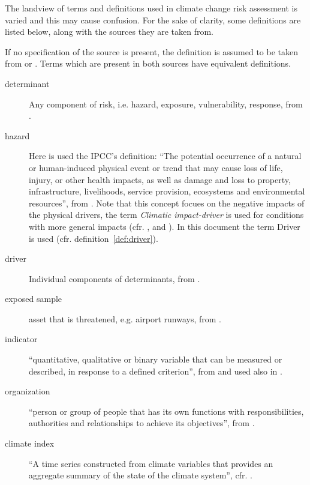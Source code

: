 The landview of terms and definitions used in climate change risk assessment is varied and this may cause confusion. For the sake of clarity, some definitions are listed below, along with the sources they are taken from.

If no specification of the source is present, the definition is assumed to be taken from \cite{2021ISO14091} or \cite{2021MatthewsAnnexVII}. Terms which are present in both sources have equivalent definitions.

\begin{description}
  \item[determinant] Any component of risk, i.e. hazard, exposure, vulnerability, response, from \cite[493]{2023SimpsonAdaptationTo}.
  \item[hazard] Here is used the IPCC's definition: ``The potential occurrence of a natural or human-induced
  physical event or trend that may cause loss of life, injury, or other
  health impacts, as well as damage and loss to property, infrastructure,
  livelihoods, service provision, ecosystems and environmental
  resources'', from \cite[2233]{2021MatthewsAnnexVII}. Note that this concept focues on the negative impacts of the physical drivers, the term \emph{Climatic impact-driver} is used for conditions with more general impacts (cfr. \cite[2224]{2021MatthewsAnnexVII}, \cite[10]{2020ReisingerGuidanceFor} and \cite[1871]{2021RanasingheClimateChange}). In this document the term Driver is used (cfr. definition~\ref{def:driver}).
  \label{def:driver}\item[driver] Individual components of determinants, from \cite[493]{2023SimpsonAdaptationTo}.
  \item[exposed sample] asset that is threatened, e.g. airport runways, from \cite[553]{2022DeVivoRiskAssessment}.
  \item[indicator] ``quantitative, qualitative or binary variable that can be measured or described, in response to a defined criterion'', from \cite{2021ISO14091} and used also in \cite{2022DeVivoRiskAssessment,2023DeVivoApplicationOf,2023DeVivoClimate-RiskAssessment}.
  \item[organization] ``person or group of people that has its own functions with responsibilities, authorities and relationships to achieve its objectives'', from \cite{2021ISO14091}.
  \item[climate index] ``A time series constructed from climate variables that provides an aggregate summary of the state of the climate system'', cfr. \cite{2021MatthewsAnnexVII}.
\end{description}
